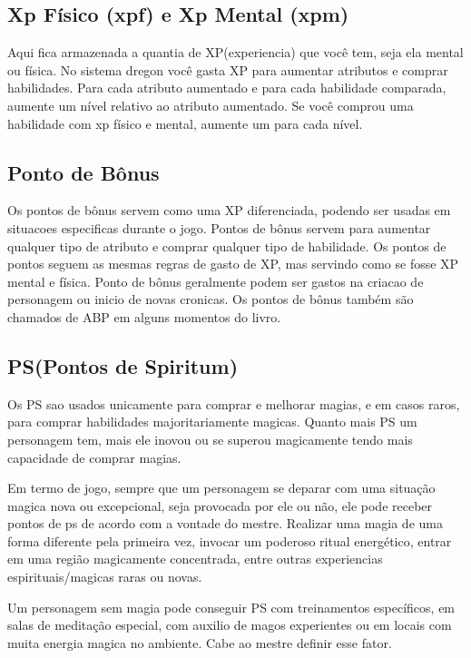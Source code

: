 \subsection{Xp Físico (xpf) e Xp Mental (xpm)}    

Aqui fica armazenada a quantia de XP(experiencia) que você tem, seja ela mental ou física. No sistema dregon você gasta XP para aumentar atributos e comprar habilidades. Para cada atributo aumentado e para cada habilidade comparada, aumente um nível relativo ao atributo aumentado. Se você comprou uma habilidade com xp físico e mental, aumente um para cada nível.

\subsection{Ponto de Bônus}

Os pontos de bônus servem como uma XP diferenciada, podendo ser usadas em situacoes especificas durante o jogo. Pontos de bônus servem para aumentar qualquer tipo de atributo e comprar qualquer tipo de habilidade. Os pontos de pontos seguem as mesmas regras de gasto de XP, mas servindo como se fosse XP mental e física. Ponto de bônus geralmente podem ser gastos na criacao de personagem ou inicio de novas cronicas. Os pontos de bônus também são chamados de ABP em alguns momentos do livro.


\subsection{PS(Pontos de Spiritum)}

	Os PS sao usados unicamente para comprar e melhorar magias, e em casos raros, para comprar habilidades majoritariamente magicas. Quanto mais PS um personagem tem, mais ele inovou ou se superou magicamente tendo mais capacidade de comprar magias.
	

	Em termo de jogo, sempre que um personagem se deparar com uma situação magica nova ou excepcional, seja provocada por ele ou não, ele pode receber pontos de ps de acordo com a vontade do mestre. Realizar uma magia de uma forma diferente pela primeira vez, invocar um poderoso ritual energético, entrar em uma região magicamente concentrada, entre outras experiencias espirituais/magicas raras ou novas. 
	

Um personagem sem magia pode conseguir PS com treinamentos específicos, em salas de meditação especial, com auxilio de magos experientes ou em locais com muita energia magica no ambiente. Cabe ao mestre definir esse fator.

